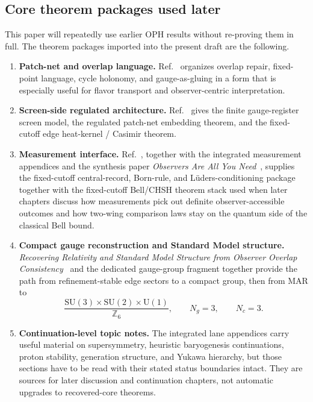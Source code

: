 \documentclass[11pt]{article}
\newcommand{\SU}{\mathrm{SU}}
\newcommand{\U}{\mathrm{U}}
\begin{document}
\subsection{Core theorem packages used later}

This paper will repeatedly use earlier OPH results without re-proving them in full. The
theorem packages imported into the present draft are the following.

\begin{enumerate}[leftmargin=2em]
\item \textbf{Patch-net and overlap language.} Ref.~\cite{ophconsensus} organizes overlap repair,
fixed-point language, cycle holonomy, and gauge-as-gluing in a form that is especially useful
for flavor transport and observer-centric interpretation.
\item \textbf{Screen-side regulated architecture.} Ref.~\cite{ophmicrophysics} gives the
finite gauge-register screen model, the regulated patch-net embedding theorem, and the fixed-cutoff
edge heat-kernel / Casimir theorem.
\item \textbf{Measurement interface.} Ref.~\cite{ophmicrophysics}, together with the integrated
measurement appendices and the synthesis paper \emph{Observers Are All You Need}~\cite{ophsynthesis}, supplies the fixed-cutoff central-record, Born-rule, and
L\"uders-conditioning package together with the fixed-cutoff Bell/CHSH theorem stack used when
later chapters discuss how measurements pick out definite observer-accessible outcomes and how
two-wing comparison laws stay on the quantum side of the classical Bell bound.
\item \textbf{Compact gauge reconstruction and Standard Model structure.}
\emph{Recovering Relativity and Standard Model Structure from Observer Overlap Consistency}~\cite{ophcompact}
and the dedicated gauge-group fragment together provide the path from refinement-stable
edge sectors to a compact group, then from MAR to
\[
\frac{\SU(3)\times\SU(2)\times\U(1)}{\mathbb Z_6},
\qquad
N_g=3,
\qquad
N_c=3.
\]
\item \textbf{Continuation-level topic notes.} The integrated lane appendices carry useful material
on supersymmetry, heuristic baryogenesis continuations, proton stability, generation structure, and Yukawa hierarchy,
but those sections have to be read with their stated status boundaries intact. They are sources
for later discussion and continuation chapters, not automatic upgrades to recovered-core theorems.
\end{enumerate}
\end{document}
